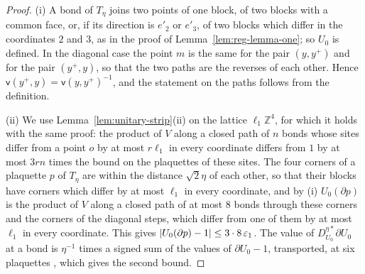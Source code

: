 \documentclass[11pt]{preprint}
\DeclarePairedDelimiter{\abs}{\lvert}{\rvert}
\numberwithin{equation}{section}
\theoremstyle{definition}
\theoremstyle{remark}
\theoremstyle{plain}
\begin{document}
\begin{proof}
(i) A bond of $T_\eta$ joins two points of one block, of two blocks with a common face, or, if its direction is $e'_2$ or $e'_3$, of two blocks which differ in the coordinates $2$ and $3$, as in the proof of Lemma~\ref{lem:reg-lemma-one}; so $U_0$ is defined. In the diagonal case the point $m$ is the same for the pair $(y, y^+)$ and for the pair $(y^+, y)$, so that the two paths are the reverses of each other. Hence $\mathsf v(y^+, y) = \mathsf v(y, y^+)^{-1}$, and the statement on the paths follows from the definition.

(ii) We use Lemma~\ref{lem:unitary-strip}(ii) on the lattice $\ell_1\mathbb Z^4$, for which it holds with the same proof: the product of $V$ along a closed path of $n$ bonds whose sites differ from a point $o$ by at most $r\ell_1$ in every coordinate differs from $1$ by at most $3rn$ times the bound on the plaquettes of these sites. The four corners of a plaquette $p$ of $T_\eta$ are within the distance $\sqrt2\eta$ of each other, so that their blocks have corners which differ by at most $\ell_1$ in every coordinate, and by (i) $U_0(\partial p)$ is the product of $V$ along a closed path of at most $8$ bonds through these corners and the corners of the diagonal steps, which differ from one of them by at most $\ell_1$ in every coordinate. This gives $\abs{U_0(\partial p) - 1} \leq 3 \cdot 8\,\varepsilon_1$. The value of $D^{\eta*}_{U_0}\partial U_0$ at a bond is $\eta^{-1}$ times a signed sum of the values of $\partial U_0 - 1$, transported, at six plaquettes \cite[(1.1), (1.2)]{BalabanREG}, which gives the second bound.


\end{proof}
\end{document}
